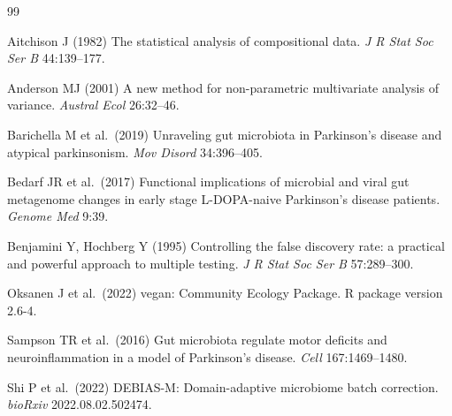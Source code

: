 \documentclass[12pt,a4paper]{article}
\begin{document}
\begin{thebibliography}{99}

Aitchison J (1982) The statistical analysis of compositional data.
\textit{J R Stat Soc Ser B} 44:139--177.

Anderson MJ (2001) A new method for non-parametric multivariate analysis
of variance. \textit{Austral Ecol} 26:32--46.

Barichella M et al.\ (2019) Unraveling gut microbiota in Parkinson's
disease and atypical parkinsonism. \textit{Mov Disord} 34:396--405.

Bedarf JR et al.\ (2017) Functional implications of microbial and viral
gut metagenome changes in early stage L-DOPA-naive Parkinson's disease
patients. \textit{Genome Med} 9:39.

Benjamini Y, Hochberg Y (1995) Controlling the false discovery rate:
a practical and powerful approach to multiple testing.
\textit{J R Stat Soc Ser B} 57:289--300.

Oksanen J et al.\ (2022) vegan: Community Ecology Package.
R package version 2.6-4.

Sampson TR et al.\ (2016) Gut microbiota regulate motor deficits and
neuroinflammation in a model of Parkinson's disease.
\textit{Cell} 167:1469--1480.

Shi P et al.\ (2022) DEBIAS-M: Domain-adaptive microbiome batch correction.
\textit{bioRxiv} 2022.08.02.502474.

\end{thebibliography}
\end{document}
